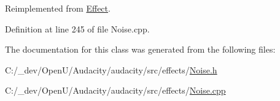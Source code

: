 Reimplemented from \hyperlink{class_effect_aa55e73977e578fd18c07c4628695ee4e}{Effect}.



Definition at line 245 of file Noise.\+cpp.



The documentation for this class was generated from the following files\+:\begin{DoxyCompactItemize}
\item 
C\+:/\+\_\+dev/\+Open\+U/\+Audacity/audacity/src/effects/\hyperlink{src_2effects_2_noise_8h}{Noise.\+h}\item 
C\+:/\+\_\+dev/\+Open\+U/\+Audacity/audacity/src/effects/\hyperlink{src_2effects_2_noise_8cpp}{Noise.\+cpp}\end{DoxyCompactItemize}
